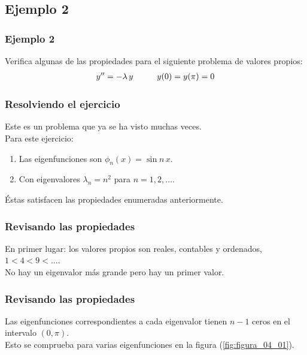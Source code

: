 \documentclass[12pt]{beamer}
\begin{document}
\subsection*{Ejemplo 2}

\begin{frame}
\frametitle{Ejemplo 2}
Verifica algunas de las propiedades para el siguiente problema de valores propios:
\pause
\begin{align*}
{y}^{\prime \prime} = - \lambda \, y \hspace{1cm} y(0) = y(\pi) = 0
\end{align*}
\end{frame}
\begin{frame}
\frametitle{Resolviendo el ejercicio}
Este es un problema que ya se ha visto muchas veces.
\\
\bigskip
\pause
Para este ejercicio:
\begin{enumerate}[<+->]
\item Las eigenfunciones son $\phi_{n} (x) = \sin n\, x$.
\item Con eigenvalores $\lambda_{n} = n^{2}$ para $n = 1, 2, \ldots$.
\end{enumerate}
\pause
Éstas satisfacen las propiedades enumeradas anteriormente.
\end{frame}
\begin{frame}
\frametitle{Revisando las propiedades}
En primer lugar: \pause los valores propios son reales, contables y ordenados, $1 < 4 < 9 < \ldots$.
\\
\bigskip
\pause
No hay un eigenvalor más grande pero hay un primer valor.
\end{frame}
\begin{frame}
\frametitle{Revisando las propiedades}
Las eigenfunciones correspondientes a cada eigenvalor tienen $n -1$ ceros en el intervalo $(0, \pi)$.
\\
\bigskip
\pause
Esto se comprueba para varias eigenfunciones en la figura (\ref{fig:figura_04_01}).
\end{frame}
\end{document}
